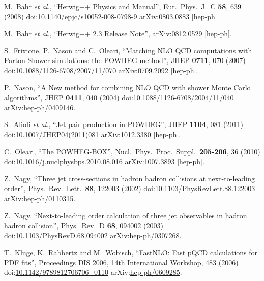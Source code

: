 \begin{thebibliography}{99}
M.~Bahr {\it et al.}, ``Herwig++ Physics and Manual'', Eur.\ Phys.\ J.\ C {\bf 58}, 639 (2008) doi:\href{http://dx.doi.org/10.1140/epjc/s10052-008-0798-9}{10.1140/epjc/s10052-008-0798-9} arXiv:\href{https://arxiv.org/abs/0803.0883}{0803.0883 [hep-ph]}.

M.~Bahr {\it et al.}, ``Herwig++ 2.3 Release Note'', arXiv:\href{https://arxiv.org/abs/0812.0529}{0812.0529 [hep-ph]}.

S.~Frixione, P.~Nason and C.~Oleari, ``Matching NLO QCD computations with Parton Shower simulations: the POWHEG method'', JHEP {\bf 0711}, 070 (2007) doi:\href{http://dx.doi.org/10.1088/1126-6708/2007/11/070}{10.1088/1126-6708/2007/11/070} arXiv:\href{https://arxiv.org/abs/0709.2092}{0709.2092 [hep-ph]}.

P.~Nason, ``A New method for combining NLO QCD with shower Monte Carlo algorithms'', JHEP {\bf 0411}, 040 (2004) doi:\href{http://dx.doi.org/10.1088/1126-6708/2004/11/040}{10.1088/1126-6708/2004/11/040} arXiv:\href{https://arxiv.org/abs/hep-ph/0409146}{hep-ph/0409146}.

S.~Alioli {\it et al.}, ``Jet pair production in POWHEG'', JHEP {\bf 1104}, 081 (2011) doi:\href{http://dx.doi.org/10.1007/JHEP04(2011)081}{10.1007/JHEP04(2011)081} arXiv:\href{https://arxiv.org/abs/1012.3380}{1012.3380 [hep-ph]}.

C.~Oleari, ``The POWHEG-BOX'', Nucl.\ Phys.\ Proc.\ Suppl.\ {\bf 205-206}, 36 (2010) doi:\href{http://dx.doi.org/10.1016/j.nuclphysbps.2010.08.016}{10.1016/j.nuclphysbps.2010.08.016} arXiv:\href{https://arxiv.org/abs/1007.3893}{1007.3893 [hep-ph]}.

Z.~Nagy, ``Three jet cross-sections in hadron hadron collisions at next-to-leading order'', Phys.\ Rev.\ Lett.\ {\bf 88}, 122003 (2002) doi:\href{http://dx.doi.org/10.1103/PhysRevLett.88.122003}{10.1103/PhysRevLett.88.122003} arXiv:\href{https://arxiv.org/abs/hep-ph/0110315}{hep-ph/0110315}.

Z.~Nagy, ``Next-to-leading order calculation of three jet observables in hadron hadron collision'', Phys.\ Rev.\ D {\bf 68}, 094002 (2003) doi:\href{http://dx.doi.org/10.1103/PhysRevD.68.094002}{10.1103/PhysRevD.68.094002} arXiv:\href{https://arxiv.org/abs/hep-ph/0307268}{hep-ph/0307268}.

T.~Kluge, K.~Rabbertz and M.~Wobisch, ``FastNLO: Fast pQCD calculations for PDF fits'', Proceedings DIS 2006, 14th International Workshop, 483 (2006) doi:\href{http://dx.doi.org/10.1142/9789812706706\_0110}{10.1142/9789812706706\_0110} arXiv:\href{https://arxiv.org/abs/hep-ph/0609285}{hep-ph/0609285}.


\end{thebibliography}
